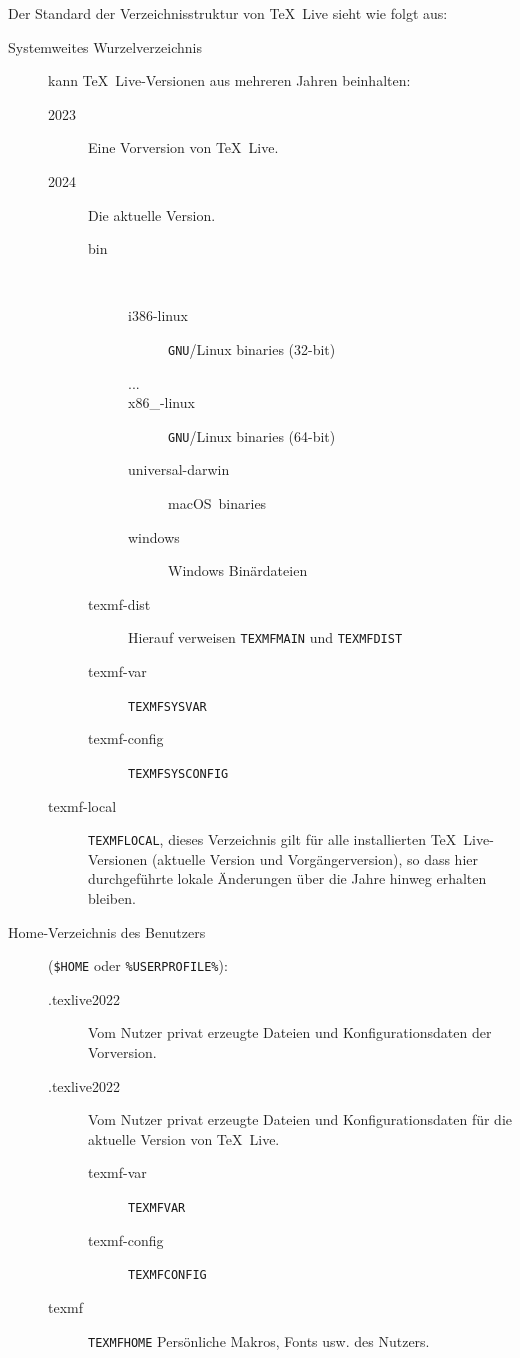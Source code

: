 \documentclass[12pt,ngerman,a4paper,fullparskip]{report}
\newcommand{\TL}{\TeX\ Live\xspace}
\newcommand{\acro}[1]{\texttt{#1}}
\newcommand{\envname}[1]{\texttt{#1}}
\providecommand*{\GNU}{\acro{GNU}\xspace}
\providecommand*{\macOS}{macOS\xspace}
\begin{document}
Der Standard der Verzeichnisstruktur von \TL sieht wie folgt aus:
\begin{description}
  \item[Systemweites Wurzelverzeichnis] kann \TL{}-Versionen aus mehreren Jahren beinhalten:
  \begin{description}
    \item[2023] Eine Vorversion von \TL.
    \item[2024] Die aktuelle Version.
    \begin{description}
      \item [bin] ~
      \begin{description}
        \item [i386-linux] \GNU/Linux binaries (32-bit)
        \item [...]
        \item [x86\_-linux] \GNU/Linux binaries (64-bit)
        \item [universal-darwin] \macOS\ binaries
        \item [windows] Windows Binärdateien
      \end{description}
      \item [texmf-dist\ \ ] Hierauf verweisen \envname{TEXMFMAIN} und \envname{TEXMFDIST}
      \item [texmf-var\ \ ] \envname{TEXMFSYSVAR}
      \item [texmf-config \ \ ] \envname{TEXMFSYSCONFIG}
    \end{description}
    \item [texmf-local] \envname{TEXMFLOCAL}, dieses Verzeichnis gilt für alle installierten \TL-Versionen
         (aktuelle Version und Vorgängerversion), so dass hier durchgeführte lokale Änderungen über die
         Jahre hinweg erhalten bleiben.
  \end{description}
  \item[Home-Verzeichnis des Benutzers]
      (\texttt{\$HOME} oder \texttt{\%USERPROFILE\%}):
    \begin{description}
      \item[.texlive2022] Vom Nutzer privat erzeugte Dateien und Konfigurationsdaten
        der Vorversion.
      \item[.texlive2022] Vom Nutzer privat erzeugte Dateien und Konfigurationsdaten
        für die aktuelle Version von \TL.
      \begin{description}
        \item [texmf-var\ \ \ ] \envname{TEXMFVAR}
        \item [texmf-config] \envname{TEXMFCONFIG}
      \end{description}
    \item[texmf] \envname{TEXMFHOME} Persönliche Makros, Fonts usw. des Nutzers.
  \end{description}
\end{description}
\end{document}
